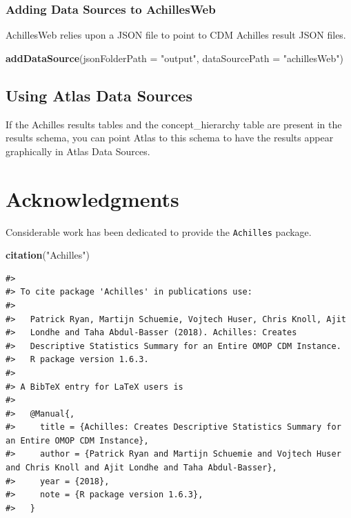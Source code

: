 \documentclass[]{article}
\newenvironment{Shaded}{\begin{snugshade}}{\end{snugshade}}
\newcommand{\KeywordTok}[1]{\textcolor[rgb]{0.13,0.29,0.53}{\textbf{#1}}}
\newcommand{\DataTypeTok}[1]{\textcolor[rgb]{0.13,0.29,0.53}{#1}}
\newcommand{\StringTok}[1]{\textcolor[rgb]{0.31,0.60,0.02}{#1}}
\newcommand{\NormalTok}[1]{#1}
\begin{document}
\subsubsection{Adding Data Sources to
AchillesWeb}\label{adding-data-sources-to-achillesweb}

AchillesWeb relies upon a JSON file to point to CDM Achilles result JSON
files.

\begin{Shaded}
\begin{Highlighting}[]
\KeywordTok{addDataSource}\NormalTok{(}\DataTypeTok{jsonFolderPath =} \StringTok{"output"}\NormalTok{, }
              \DataTypeTok{dataSourcePath =} \StringTok{"achillesWeb"}\NormalTok{)}
\end{Highlighting}
\end{Shaded}

\subsection{Using Atlas Data Sources}\label{using-atlas-data-sources}

If the Achilles results tables and the concept\_hierarchy table are
present in the results schema, you can point Atlas to this schema to
have the results appear graphically in Atlas Data Sources.

\section{Acknowledgments}\label{acknowledgments}

Considerable work has been dedicated to provide the \texttt{Achilles}
package.

\begin{Shaded}
\begin{Highlighting}[]
\KeywordTok{citation}\NormalTok{(}\StringTok{"Achilles"}\NormalTok{)}
\end{Highlighting}
\end{Shaded}

\begin{verbatim}
#> 
#> To cite package 'Achilles' in publications use:
#> 
#>   Patrick Ryan, Martijn Schuemie, Vojtech Huser, Chris Knoll, Ajit
#>   Londhe and Taha Abdul-Basser (2018). Achilles: Creates
#>   Descriptive Statistics Summary for an Entire OMOP CDM Instance.
#>   R package version 1.6.3.
#> 
#> A BibTeX entry for LaTeX users is
#> 
#>   @Manual{,
#>     title = {Achilles: Creates Descriptive Statistics Summary for an Entire OMOP CDM Instance},
#>     author = {Patrick Ryan and Martijn Schuemie and Vojtech Huser and Chris Knoll and Ajit Londhe and Taha Abdul-Basser},
#>     year = {2018},
#>     note = {R package version 1.6.3},
#>   }
\end{verbatim}
\end{document}
